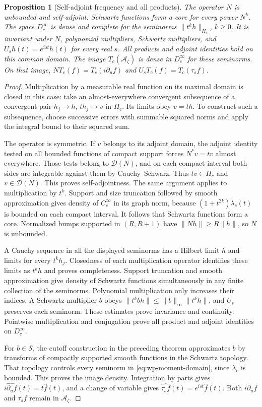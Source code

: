\documentclass[11pt]{article}
\newtheorem{proposition}[theorem]{Proposition}
\theoremstyle{definition}
\theoremstyle{remark}
\numberwithin{equation}{section}
\newcommand{\cA}{\mathcal A}
\begin{document}
\begin{proposition}[Self-adjoint frequency and all products]
\label{prop:wp-domain}
The operator $N$ is unbounded and self-adjoint.
Schwartz functions form a core for every power $N^k$.
The space $D_c^\infty$ is dense and complete for the seminorms
$\|t^k h\|_{H_c}$, $k\geq0$.
It is invariant under $N$, polynomial multipliers, Schwartz multipliers,
and $U_s h(t)=e^{ist}h(t)$ for every real $s$.
All products and adjoint identities hold on this common domain.
The image $T_c(\cA_\zeta)$ is dense in $D_c^\infty$ for these seminorms.
On that image, $N T_c(f)=T_c(i\partial_u f)$ and
$U_s T_c(f)=T_c(\tau_s f)$.
\end{proposition}
\begin{proof}
Multiplication by a measurable real function on its maximal domain is
closed in this case: take an almost-everywhere convergent subsequence
of a convergent pair $h_j\to h$, $t h_j\to v$ in $H_c$.
Its limits obey $v=th$.
To construct such a subsequence, choose successive errors with summable
squared norms and apply the integral bound to their squared sum.

The operator is symmetric.
If $v$ belongs to its adjoint domain, the adjoint identity tested on all
bounded functions of compact support forces $N^*v=tv$ almost everywhere.
Those tests belong to $\mathcal D(N)$, and on each compact interval
both sides are integrable against them by Cauchy--Schwarz.
Thus $tv\in H_c$ and $v\in\mathcal D(N)$.
This proves self-adjointness.
The same argument applies to multiplication by $t^k$.
Support and size truncation followed by smooth approximation gives density
of $C_c^\infty$ in its graph norm, because
$(1+t^{2k})\lambda_c(t)$ is bounded on each compact interval.
It follows that Schwartz functions form a core.
Normalized bumps supported in $(R,R+1)$ have $\|Nh\|\geq R\|h\|$,
so $N$ is unbounded.

A Cauchy sequence in all the displayed seminorms has a Hilbert limit
$h$ and limits for every $t^k h_j$.
Closedness of each multiplication operator identifies these limits as
$t^k h$ and proves completeness.
Support truncation and smooth approximation give density of Schwartz
functions simultaneously in any finite collection of the seminorms.
Polynomial multiplication only increases their indices.
A Schwartz multiplier $b$ obeys
$\|t^k bh\|\leq\|b\|_\infty\|t^k h\|$, and $U_s$ preserves each seminorm.
These estimates prove invariance and continuity.
Pointwise multiplication and conjugation prove all product and adjoint
identities on $D_c^\infty$.

For $b\in\mathscr S$, the cutoff construction in the preceding theorem
approximates $b$ by transforms of compactly supported smooth functions
in the Schwartz topology.
That topology controls every seminorm in \eqref{eq:wp-moment-domain},
since $\lambda_c$ is bounded.
This proves the image density.
Integration by parts gives $\widehat{i\partial_u f}(t)=t\widehat f(t)$,
and a change of variable gives $\widehat{\tau_s f}(t)=e^{ist}\widehat f(t)$.
Both $i\partial_u f$ and $\tau_s f$ remain in $\cA_\zeta$.
\end{proof}
\end{document}
